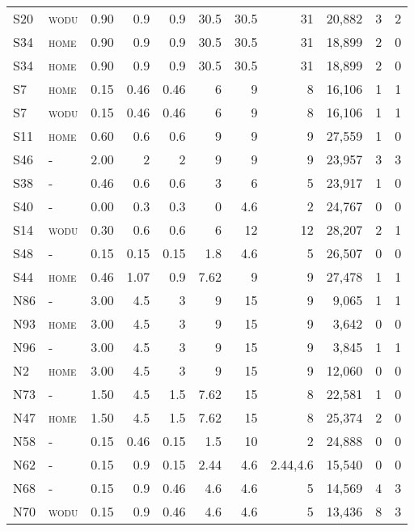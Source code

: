 {\begin{landscape}
\begin{Spacing}{1}
\begin{longtable}[c]{@{}llrrrrrrrrr}
S20 & \textsc{wodu} & 0.90 & 0.9 & 0.9 & 30.5 & 30.5 & 31 & 20,882 & 3 & 2 \tabularnewline
S34 & \textsc{home} & 0.90 & 0.9 & 0.9 & 30.5 & 30.5 & 31 & 18,899 & 2 & 0 \tabularnewline
S34 & \textsc{home} & 0.90 & 0.9 & 0.9 & 30.5 & 30.5 & 31 & 18,899 & 2 & 0 \tabularnewline
S7 & \textsc{home} & 0.15 & 0.46 & 0.46 & 6 & 9 & 8 & 16,106 & 1 & 1 \tabularnewline
S7 & \textsc{wodu} & 0.15 & 0.46 & 0.46 & 6 & 9 & 8 & 16,106 & 1 & 1 \tabularnewline
S11 & \textsc{home} & 0.60 & 0.6 & 0.6 & 9 & 9 & 9 & 27,559 & 1 & 0 \tabularnewline
S46 & - & 2.00 & 2 & 2 & 9 & 9 & 9 & 23,957 & 3 & 3 \tabularnewline
S38 & - & 0.46 & 0.6 & 0.6 & 3 & 6 & 5 & 23,917 & 1 & 0 \tabularnewline
S40 & - & 0.00 & 0.3 & 0.3 & 0 & 4.6 & 2 & 24,767 & 0 & 0 \tabularnewline
S14 & \textsc{wodu} & 0.30 & 0.6 & 0.6 & 6 & 12 & 12 & 28,207 & 2 & 1 \tabularnewline
S48 & - & 0.15 & 0.15 & 0.15 & 1.8 & 4.6 & 5 & 26,507 & 0 & 0 \tabularnewline
S44 & \textsc{home} & 0.46 & 1.07 & 0.9 & 7.62 & 9 & 9 & 27,478 & 1 & 1 \tabularnewline
N86 & - & 3.00 & 4.5 & 3 & 9 & 15 & 9 & 9,065 & 1 & 1 \tabularnewline
N93 & \textsc{home} & 3.00 & 4.5 & 3 & 9 & 15 & 9 & 3,642 & 0 & 0 \tabularnewline
N96 & - & 3.00 & 4.5 & 3 & 9 & 15 & 9 & 3,845 & 1 & 1 \tabularnewline
N2 & \textsc{home} & 3.00 & 4.5 & 3 & 9 & 15 & 9 & 12,060 & 0 & 0 \tabularnewline
N73 & - & 1.50 & 4.5 & 1.5 & 7.62 & 15 & 8 & 22,581 & 1 & 0 \tabularnewline
N47 & \textsc{home} & 1.50 & 4.5 & 1.5 & 7.62 & 15 & 8 & 25,374 & 2 & 0 \tabularnewline
N58 & - & 0.15 & 0.46 & 0.15 & 1.5 & 10 & 2 & 24,888 & 0 & 0 \tabularnewline
N62 & - & 0.15 & 0.9 & 0.15 & 2.44 & 4.6 &  2.44,4.6  & 15,540 & 0 & 0 \tabularnewline
N68 & - & 0.15 & 0.9 & 0.46 & 4.6 & 4.6 & 5 & 14,569 & 4 & 3 \tabularnewline
N70 & \textsc{wodu} & 0.15 & 0.9 & 0.46 & 4.6 & 4.6 & 5 & 13,436 & 8 & 3 \tabularnewline
\bottomrule
\end{longtable}
\end{Spacing}
\end{landscape}
\clearpage
}